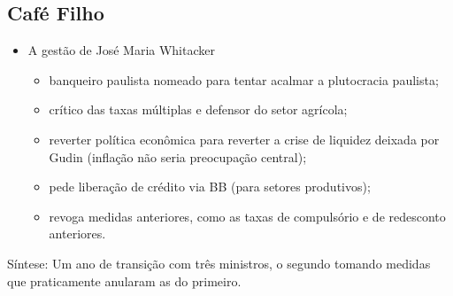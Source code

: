 \documentclass[a4paper,12pt]{article}[abntex2]
\begin{document}
\subsection{Café Filho}
\begin{itemize}
    \item A gestão de José Maria Whitacker 
    \begin{itemize}
        \item banqueiro paulista nomeado para tentar acalmar a plutocracia paulista;
        \item crítico das taxas múltiplas e defensor do setor agrícola;
        \item reverter política econômica para reverter a crise de liquidez deixada por Gudin (inflação não seria preocupação central);
        \item pede liberação de crédito via BB (para setores produtivos);
        \item revoga medidas anteriores, como as taxas de compulsório e de redesconto anteriores.
    \end{itemize}
\end{itemize}


Síntese: Um ano de transição com três ministros, o segundo tomando medidas que praticamente anularam as do primeiro.

 
\end{document}
